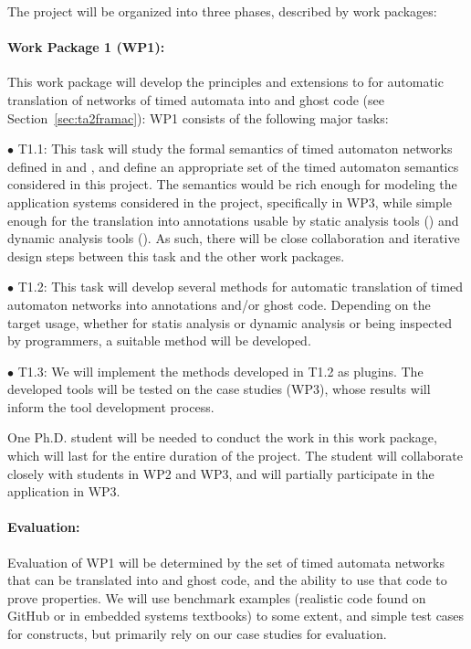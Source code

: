 The project will be organized into three phases, described by work packages:

\paragraph{Work Package 1 (WP1):} This work package will develop the
principles and extensions to \framac for automatic translation of
networks of timed automata into \acsl and ghost code (see Section~\ref{sec:ta2framac}):
WP1 consists of the following major tasks:


$\bullet$ T1.1: This task will study the formal semantics of timed automaton networks defined in \uppaal and \prism, and define an appropriate set of the timed automaton semantics considered in this project.  The semantics would be rich enough for modeling the application systems considered in the project, specifically in WP3, while simple enough for the translation into annotations usable by static analysis tools (\framac) and dynamic analysis tools (\deepstate).  As such, there will be close collaboration and iterative design steps between this task and the other work packages. %

$\bullet$ T1.2: This task will develop several methods for automatic translation of timed automaton networks into \acsl annotations and/or ghost code.  Depending on the target usage, whether for statis analysis or dynamic analysis or being inspected by programmers, a suitable method will be developed.

$\bullet$ T1.3: We will implement the methods developed in T1.2 as \framac plugins.
The developed tools will be tested on the case studies (WP3), whose results will inform the tool development process.

One Ph.D. student will be needed to conduct the work in this work package, which will last for the entire duration of the project.
The student will collaborate closely with students in WP2 and WP3, and
will partially participate in the application in WP3.

\paragraph{Evaluation:} Evaluation of
WP1 will be determined by the set of timed automata
networks that can be translated into \acsl and ghost code, and the
ability to use that code to prove properties.  We will use benchmark
examples (realistic code found on GitHub or in embedded systems
textbooks) to some extent, and simple test cases for constructs, but
primarily rely on our case studies for evaluation.


